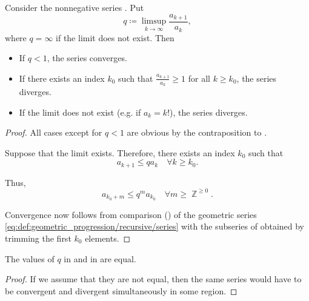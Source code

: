 \begin{proposition}\label{thm:dalamberts_ratio_test}
  Consider the nonnegative series . Put
  \begin{equation*}
    q \coloneqq \limsup_{k \to \infty} \frac {a_{k+1}} {a_k},
  \end{equation*}
  where \( q = \infty \) if the limit does not exist. Then
  \begin{itemize}
    \item If \( q < 1 \), the series converges.
    \item If there exists an index \( k_0 \) such that \( \frac {a_{k+1}} {a_k} \geq 1 \) for all \( k \geq k_0 \), the series diverges.
    \item If the limit does not exist (e.g. if \( a_k = k! \)), the series diverges.
  \end{itemize}
\end{proposition}
\begin{proof}
  All cases except for \( q < 1 \) are obvious by the contraposition to .

  Suppose that the limit exists. Therefore, there exists an index \( k_0 \) such that
  \begin{equation*}
    a_{k+1} \leq q a_k \quad\forall k \geq k_0.
  \end{equation*}

  Thus,
  \begin{equation*}
    a_{k_0 + m} \leq q^m a_{k_0} \quad\forall m \geq \BbbZ^{\geq 0}.
  \end{equation*}

  Convergence now follows from comparison () of the geometric series \eqref{eq:def:geometric_progression/recursive/series} with the subseries of  obtained by trimming the first \( k_0 \) elements.
\end{proof}

\begin{proposition}\label{rem:nonnegative_series_convergence_test_equivalence}
  The values of \( q \) in  and in  are equal.
\end{proposition}
\begin{proof}
  If we assume that they are not equal, then the same series would have to be convergent and divergent simultaneously in some region.
\end{proof}

